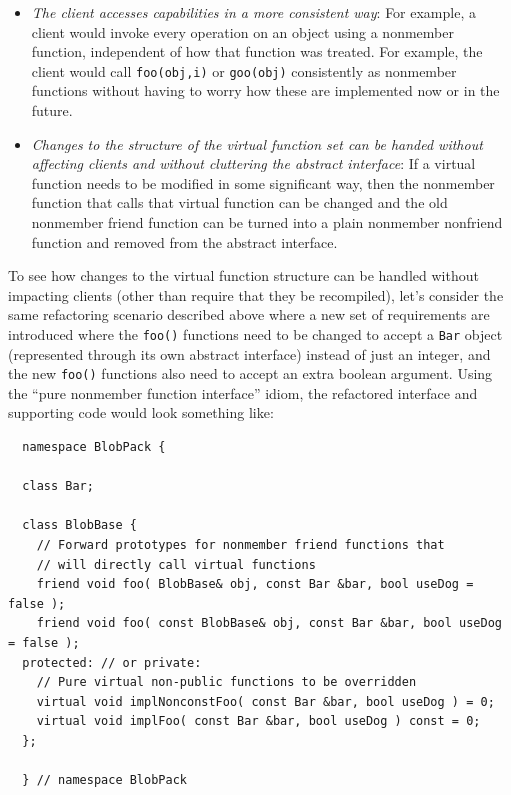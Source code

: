 \documentclass[pdf,ps2pdf,11pt]{SANDreport}
\begin{document}
\begin{itemize}

{}\item\textit{The client accesses capabilities in a more consistent way}: For
example, a client would invoke every operation on an object using a nonmember
function, independent of how that function was treated.  For example, the
client would call {}\texttt{foo(obj,i)} or {}\texttt{goo(obj)} consistently as
nonmember functions without having to worry how these are implemented now or
in the future.

{}\item\textit{Changes to the structure of the virtual function set can be
handed without affecting clients and without cluttering the abstract
interface}: If a virtual function needs to be modified in some significant
way, then the nonmember function that calls that virtual function can be
changed and the old nonmember friend function can be turned into a plain
nonmember nonfriend function and removed from the abstract interface.

\end{itemize}

To see how changes to the virtual function structure can be handled without
impacting clients (other than require that they be recompiled), let's consider
the same refactoring scenario described above where a new set of requirements
are introduced where the {}\texttt{foo()} functions need to be changed to
accept a {}\texttt{Bar} object (represented through its own abstract
interface) instead of just an integer, and the new {}\texttt{foo()} functions
also need to accept an extra boolean argument.  Using the ``pure nonmember
function interface'' idiom, the refactored interface and supporting code would
look something like:

{\small\begin{verbatim}
  namespace BlobPack {

  class Bar;

  class BlobBase {
    // Forward prototypes for nonmember friend functions that
    // will directly call virtual functions
    friend void foo( BlobBase& obj, const Bar &bar, bool useDog = false );
    friend void foo( const BlobBase& obj, const Bar &bar, bool useDog = false );
  protected: // or private:
    // Pure virtual non-public functions to be overridden
    virtual void implNonconstFoo( const Bar &bar, bool useDog ) = 0;
    virtual void implFoo( const Bar &bar, bool useDog ) const = 0;
  };

  } // namespace BlobPack
\end{verbatim}}
\end{document}
